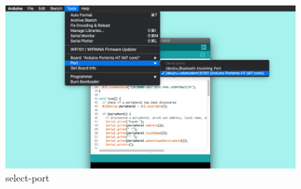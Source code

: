 \begin{itemize}
					\begin{figure}
						\begin{center}
							\includegraphics[width=0.7\linewidth]{Images/PortentaH7/select-port.png}
							\caption{select-port}
							\label{select-port}
						\end{center}
					\end{figure}
					

\end{itemize}
